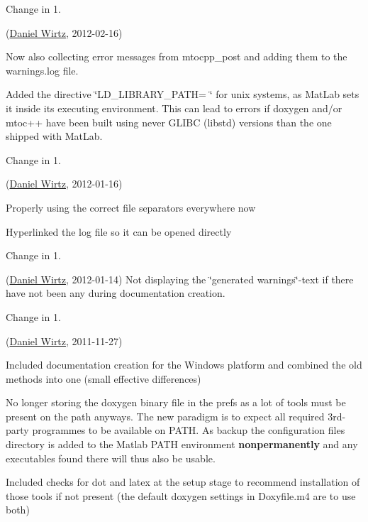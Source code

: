 \begin{DoxyRefDesc}{Change in 1.}
\item[\hyperlink{changelog1_3__changelog1_3000001}{Change in 1.\+3}](\hyperlink{developers_dw}{Daniel Wirtz}, 2012-\/02-\/16)
\begin{DoxyItemize}
\item Now also collecting error messages from mtocpp\+\_\+post and adding them to the warnings.\+log file.
\item Added the directive \char`\"{}\+L\+D\+\_\+\+L\+I\+B\+R\+A\+R\+Y\+\_\+\+P\+A\+T\+H= \char`\"{} for unix systems, as Mat\+Lab sets it inside its executing environment. This can lead to errors if doxygen and/or mtoc++ have been built using never G\+L\+I\+B\+C (libstd) versions than the one shipped with Mat\+Lab.
\end{DoxyItemize}\end{DoxyRefDesc}


\begin{DoxyRefDesc}{Change in 1.}
\item[\hyperlink{changelog1_3__changelog1_3000002}{Change in 1.\+3}](\hyperlink{developers_dw}{Daniel Wirtz}, 2012-\/01-\/16)
\begin{DoxyItemize}
\item Properly using the correct file separators everywhere now
\item Hyperlinked the log file so it can be opened directly
\end{DoxyItemize}\end{DoxyRefDesc}


\begin{DoxyRefDesc}{Change in 1.}
\item[\hyperlink{changelog1_3__changelog1_3000003}{Change in 1.\+3}](\hyperlink{developers_dw}{Daniel Wirtz}, 2012-\/01-\/14) Not displaying the \char`\"{}generated warnings\char`\"{}-\/text if there have not been any during documentation creation.\end{DoxyRefDesc}


\begin{DoxyRefDesc}{Change in 1.}
\item[\hyperlink{changelog1_2__changelog1_2000001}{Change in 1.\+2}](\hyperlink{developers_dw}{Daniel Wirtz}, 2011-\/11-\/27)
\begin{DoxyItemize}
\item Included documentation creation for the Windows platform and combined the old methods into one (small effective differences)
\item No longer storing the doxygen binary file in the prefs as a lot of tools must be present on the path anyways. The new paradigm is to expect all required 3rd-\/party programmes to be available on P\+A\+T\+H. As backup the configuration files directory is added to the Matlab P\+A\+T\+H environment {\bfseries nonpermanently} and any executables found there will thus also be usable.
\item Included checks for {\ttfamily dot} and {\ttfamily latex} at the setup stage to recommend installation of those tools if not present (the default doxygen settings in Doxyfile.\+m4 are to use both)
\end{DoxyItemize}\end{DoxyRefDesc}


